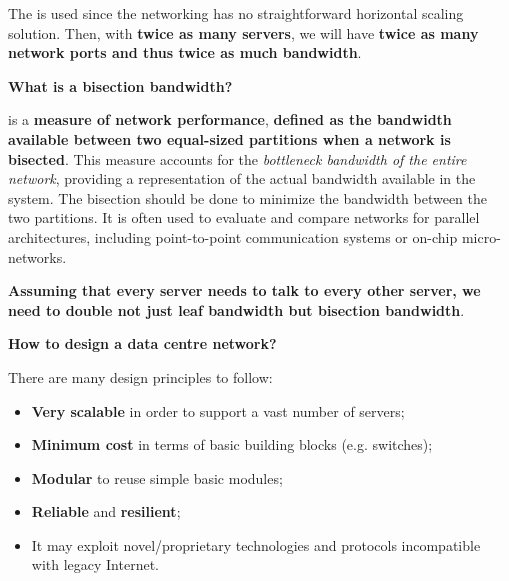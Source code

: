 \highspace
The  is used since the networking has no straightforward horizontal scaling solution. Then, with \textbf{twice as many servers}, we will have \textbf{twice as many network ports and thus twice as much bandwidth}.

\highspace
\begin{flushleft}
    \textcolor{Green3}{ \textbf{What is a bisection bandwidth?}}
\end{flushleft}
 is a \textbf{measure of network performance}, \textbf{defined as the bandwidth available between two equal-sized partitions when a network is bisected}. This measure accounts for the \emph{bottleneck bandwidth of the entire network}, providing a representation of the actual bandwidth available in the system. The bisection should be done to minimize the bandwidth between the two partitions. It is often used to evaluate and compare networks for parallel architectures, including point-to-point communication systems or on-chip micro-networks.

\highspace
\textbf{Assuming that every server needs to talk to every other server, we need to double not just leaf bandwidth but bisection bandwidth}.

\highspace
\begin{flushleft}
    \textcolor{Green3}{ \textbf{How to design a data centre network?}}
\end{flushleft}
There are many design principles to follow:
\begin{itemize}
    \item \textbf{Very scalable} in order to support a vast number of servers;
    \item \textbf{Minimum cost} in terms of basic building blocks (e.g. switches);
    \item \textbf{Modular} to reuse simple basic modules;
    \item \textbf{Reliable} and \textbf{resilient};
    \item It may exploit novel/proprietary technologies and protocols incompatible with legacy Internet.
\end{itemize}

\newpage


